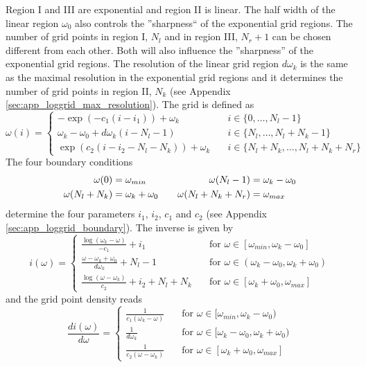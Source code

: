 Region I and III are exponential and region II is linear. The half width of the linear region $\omega_0$ also controls the ''sharpness`` of the exponential grid regions. The number of grid points in region I, $N_l$ and in region III, $N_r+1$ can be chosen different from each other. Both will also influence the ''sharpness'' of the exponential grid regions. The resolution of the linear grid region $d\omega_k$ is the same as the maximal resolution in the exponential grid regions and it determines the number of grid points in region II, $N_k$ (see Appendix \ref{sec:app_loggrid_max_resolution}). The grid is defined as
\begin{equation}\label{eqn:loggrid_definition}
	\omega(i)=\begin{cases}
		-\exp(-c_1(i-i_1)) + \omega_k 		\quad & i\in\{0,\dots,N_l-1\} \\ 
		\omega_k-\omega_0+d\omega_k(i-N_l-1)	\quad & i\in\{N_l,\dots,N_l+N_k-1\} \\ 
		\exp(c_2(i-i_2-N_l-N_k)) + \omega_k 	\quad & i\in\{N_l+N_k,\dots,N_l+N_k+N_r\}
	\end{cases}
\end{equation}
The four boundary conditions
\begin{align}\label{eqn:loggrid_boundary_conditions}
	\omega(0)&=\omega_{min} \quad &\omega(N_l-1)&=\omega_k-\omega_0 \notag \\
	\omega(N_l+N_k)&=\omega_k+\omega_0 \quad &\omega(N_l+N_k+N_r)&=\omega_{max}
\end{align}
determine the four parameters $i_1$, $i_2$, $c_1$ and $c_2$ (see Appendix \ref{sec:app_loggrid_boundary}). The inverse is given by
\[
	i(\omega)=\begin{cases}
		\frac{\log(\omega_k-\omega)}{-c_1} + i_1 \quad &\text{for } \omega\in[\omega_{min},\omega_k-\omega_0] \\
		\frac{\omega-\omega_k+\omega_0}{d\omega_k} + N_l -1\quad &\text{for } \omega\in(\omega_k-\omega_0,\omega_k+\omega_0) \\
		\frac{\log(\omega-\omega_k)}{c_2} + i_2 + N_l + N_k \quad &\text{for } \omega\in[\omega_k+\omega_0, \omega_{max}]
	\end{cases}
\]
and the grid point density reads
\begin{equation}\label{eqn:loggrid_grid_point_density}
	\frac{di(\omega)}{d\omega}=\begin{cases}
		\frac{1}{c_1(\omega_k-\omega)} \quad &\text{for } \omega\in[\omega_{min},\omega_k-\omega_0) \\
		\frac{1}{d\omega_k} \quad &\text{for } \omega\in[\omega_k-\omega_0,\omega_k+\omega_0) \\
		\frac{1}{c_2(\omega-\omega_k)}  \quad &\text{for } \omega\in[\omega_k+\omega_0, \omega_{max}]
	\end{cases}
\end{equation}

